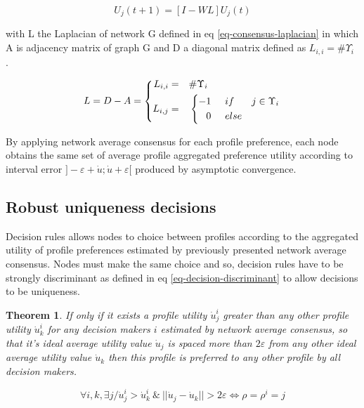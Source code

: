 \documentclass[conference]{IEEEtran}
\newtheorem{theorem}{Theorem}
\begin{document}
\begin{equation}
\label{eq-consensus-matrix}
\displaystyle
U_j(t+1) = [I-WL]U_j(t)
\end{equation}

with L the Laplacian of network G defined in eq \ref{eq-consensus-laplacian} in which A is adjacency matrix of graph G and D a diagonal matrix defined as $L_{i,i} = \#\Upsilon_i$ .

\begin{equation}
\label{eq-consensus-laplacian}
L = D - A = \left\{
      \begin{aligned}
      L_{i,i} &= &\#\Upsilon_i\hspace{2.6cm}\\
      L_{i,j} &= &\left\{
                \begin{aligned}
                -1 \hspace{0.5cm} &if& j \in \Upsilon_i \\
                 0 \hspace{0.5cm} &else& \\
                \end{aligned}
                \right.
      \end{aligned}
    \right.
\end{equation}

By applying network average consensus for each profile preference, each node obtains the same set of average profile aggregated preference utility according to interval error $]- \varepsilon + \dot{u} ; \dot{u} + \varepsilon [$ produced by asymptotic convergence.

\subsection{Robust uniqueness decisions}
Decision rules allows nodes to choice between profiles according to the aggregated utility of profile preferences estimated by previously presented network average consensus. Nodes must make the same choice and so, decision rules have to be strongly discriminant as defined in eq \ref{eq-decision-discriminant} to allow decisions to be uniqueness. 

\begin{theorem}
\label{th-preference}
If only if it exists a profile utility $\dot{u}_j^i$ greater than any other profile utility $\dot{u}_k^i$ for any decision makers $i$ estimated by network average consensus, so that it's ideal average utility value $\dot{u}_j$ is spaced more than $2 \varepsilon$ from any other ideal average utility value $\dot{u}_k $ then this profile is preferred to any other profile by all decision makers. 
 
\begin{equation}
\label{eq-decision-discriminant}
\forall i, k, \exists j / \dot{u}_j^i > \dot{u}_k^i \ \& \ || \dot{u}_j - \dot{u}_k|| > 2 \varepsilon \Longleftrightarrow \rho = \rho^i = j
\end{equation}

\end{theorem}
\end{document}
